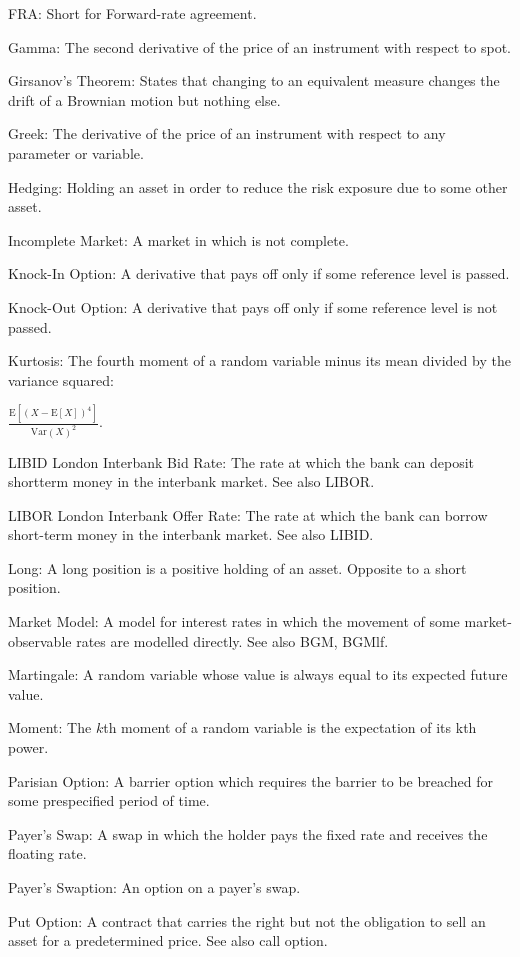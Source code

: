 FRA: Short for Forward-rate agreement.

Gamma: The second derivative of the price of an instrument with respect to spot.

Girsanov's Theorem: States that changing to an equivalent measure changes the drift of a Brownian motion but nothing else.

Greek: The derivative of the price of an instrument with respect to any parameter or variable.

Hedging: Holding an asset in order to reduce the risk exposure due to some other asset.

Incomplete Market: A market in which is not complete.

Knock-In Option: A derivative that pays off only if some reference level is passed.

Knock-Out Option: A derivative that pays off only if some reference level is not passed.

Kurtosis: The fourth moment of a random variable minus its mean divided by the variance squared:

$\frac{\text{E}[(X-\text{E}[X])^4]}{\text{Var}(X)^2}$.

LIBID London Interbank Bid Rate: The rate at which the bank can deposit shortterm money in the interbank market. See also LIBOR.

LIBOR London Interbank Offer Rate: The rate at which the bank can borrow short-term money in the interbank market. See also LIBID.

Long: A long position is a positive holding of an asset. Opposite to a short position.

Market Model: A model for interest rates in which the movement of some market-observable rates are modelled directly. See also BGM, BGMlf.

Martingale: A random variable whose value is always equal to its expected future value.

Moment: The $k$th moment of a random variable is the expectation of its kth power.

Parisian Option: A barrier option which requires the barrier to be breached for some prespecified period of time.

Payer's Swap: A swap in which the holder pays the fixed rate and receives the floating rate.

Payer's Swaption: An option on a payer's swap.

Put Option: A contract that carries the right but not the obligation to sell an asset for a predetermined price. See also call option.


